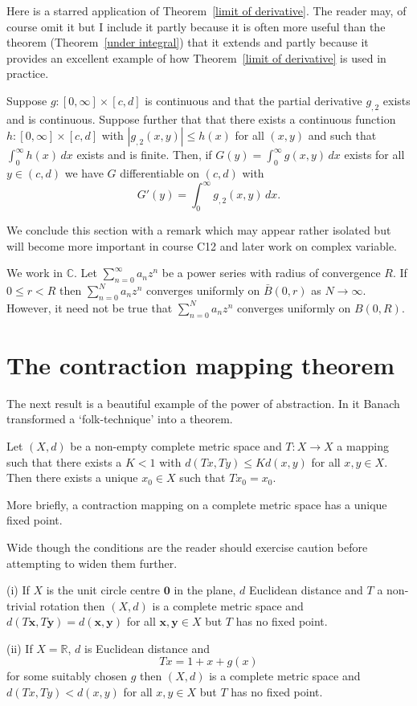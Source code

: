 Here is a starred application of 
Theorem~\ref{limit of derivative}.
The reader may, of course omit it but I include
it partly because it is often more useful than the
theorem (Theorem~\ref{under integral}) that it extends and
partly because it provides an excellent example
of how Theorem~\ref{limit of derivative} is used in practice.
\begin{theorem}%
\label{under infinite} 
Suppose $g:[0,\infty]\times[c,d]$ is
continuous and that the partial derivative $g_{,2}$
exists and is continuous.  Suppose further that
that there exists a continuous function 
$h:[0,\infty]\times[c,d]$ with $|g_{,2}(x,y)|\leq h(x)$
for all $(x,y)$ and such that $\int_{0}^{\infty}h(x)\,dx$
exists and is finite. Then, if 
$G(y)=\int_{0}^{\infty}g(x,y)\,dx$ exists for all $y\in (c,d)$
we have $G$ differentiable on $(c,d)$ with
\[G'(y)=\int_{0}^{\infty}g_{,2}(x,y)\,dx.\]
\end{theorem}

We conclude this section with a remark which may
appear rather isolated but will become more important
in course C12 and later work on complex variable.
\begin{theorem}\label{Radius and uniform}
We work in ${\mathbb C}$. Let
$\sum_{n=0}^{\infty}a_{n}z^{n}$ be a power series
with radius of convergence $R$. If $0\leq r< R$
then  $\sum_{n=0}^{N}a_{n}z^{n}$ converges uniformly
on $\bar{B}(0,r)$ as $N\rightarrow\infty$. However,
it need not be true that $\sum_{n=0}^{N}a_{n}z^{n}$ 
converges uniformly on $B(0,R)$.
\end{theorem}
\section{The contraction mapping theorem}
The next result is a beautiful example of the
power of abstraction. In it Banach transformed
a `folk-technique' into a theorem.
\begin{theorem}%
\label{contraction}
Let $(X,d)$ be a non-empty complete metric space
and $T:X\rightarrow X$ a mapping such that
there exists a $K<1$ with $d(Tx,Ty)\leq K d(x,y)$
for all $x,y\in X$. Then there exists a unique
$x_{0}\in X$ such that $Tx_{0}=x_{0}$.
\end{theorem}
More briefly, a contraction mapping on a complete
metric space has a unique fixed point.

Wide though the conditions are the reader should exercise
caution before attempting to widen them further.
\begin{example}\label{no fixed}
(i) If $X$ is the unit circle centre ${\mathbf 0}$
in the plane, $d$ Euclidean distance and $T$ a 
non-trivial rotation then $(X,d)$ is a complete
metric space and 
$d(T{\mathbf x},T{\mathbf y})=d({\mathbf x},{\mathbf y})$
for all ${\mathbf x},{\mathbf y}\in X$ but $T$ has
no fixed point.

(ii) If $X={\mathbb R}$, $d$ is Euclidean distance
and
\[Tx=1+x+g(x)\]
for some suitably chosen $g$ then $(X,d)$ is a complete
metric space and $d(Tx,Ty)< d(x,y)$
for all $x,y\in X$ but $T$ has
no fixed point.
\end{example}

